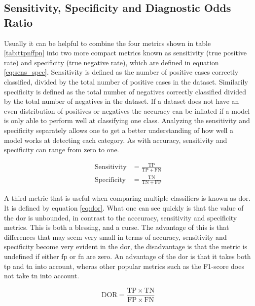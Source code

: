 \subsection{Sensitivity, Specificity and Diagnostic Odds Ratio}
Usually it can be helpful to combine the four metrics shown in table \ref{tab:ttpnffpn} into two more compact metrics known as sensitivity (true positive rate) and specificity (true negative rate), which are defined in equation \eqref{eq:sens_spec}. Sensitivity is defined as the number of positive cases correctly classified, divided by the total number of positive cases in the dataset. Similarily specificity is defined as the total number of negatives correctly classified divided by the total number of negatives in the dataset. If a dataset does not have an even distribution of positives or negatives the accuracy can be inflated if a model is only able to perform well at classifying one class. Analyzing the sensitivity and specificity separately allows one to get a better understanding of how well a model works at detecting each category. As with accuracy, sensitivity and specificity can range from zero to one.

\begin{equation}
    \begin{split}
        \mathrm{Sensitivity} &= \frac{\mathrm{TP}}{\mathrm{TP} + \mathrm{FN}} \\
        \mathrm{Specificity} &= \frac{\mathrm{TN}}{\mathrm{TN} + \mathrm{FP}}
    \end{split}
    \label{eq:sens_spec}
\end{equation}

A third metric that is useful when comparing multiple classifiers is known as \acrfull{dor}. It is defined by equation \eqref{eq:dor}. What one can see quickly is that the value of the \acrshort{dor} is unbounded, in contrast to the acccuracy, sensitivity and specificity metrics. This is both a blessing, and a curse. The advantage of this is that differences that may seem very small in terms of accuracy, sensitivity and specificity become very evident in the \acrshort{dor}, the disadvantage is that the metric is undefined if either \acrshort{fp} or \acrshort{fn} are zero. An advantage of the \acrshort{dor} is that it takes both \acrshort{tp} and \acrshort{tn} into account, wheras other popular metrics such as the F1-score does not take \acrshort{tn} into account. 

\begin{equation}
    \mathrm{DOR} = \frac{\mathrm{TP}\times\mathrm{TN}}{\mathrm{FP}\times\mathrm{FN}}
    \label{eq:dor}
\end{equation}

